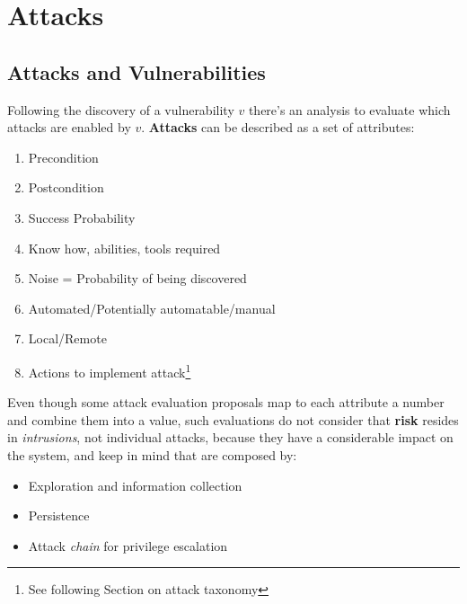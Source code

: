 \chapter{Attacks}
\section{Attacks and Vulnerabilities}
Following the discovery of a vulnerability $v$ there's an analysis to evaluate which attacks are enabled by $v$.
\textbf{Attacks} can be described as a set of attributes:
\begin{enumerate}
    \item Precondition
    \item Postcondition
    \item Success Probability
    \item Know how, abilities, tools required
    \item Noise = Probability of being discovered
    \item Automated/Potentially automatable/manual
    \item Local/Remote
    \item Actions to implement attack\footnote{See following Section on attack taxonomy}
\end{enumerate}
Even though some attack evaluation proposals map to each attribute a number and combine them into a value,
such evaluations do not consider that \textbf{risk} resides in \textit{intrusions}, not individual attacks, because they have a considerable impact on the system, and keep in mind that are composed by:
\begin{itemize}
    \item Exploration and information collection
    \item Persistence
    \item Attack \textit{chain} for privilege escalation
\end{itemize}

